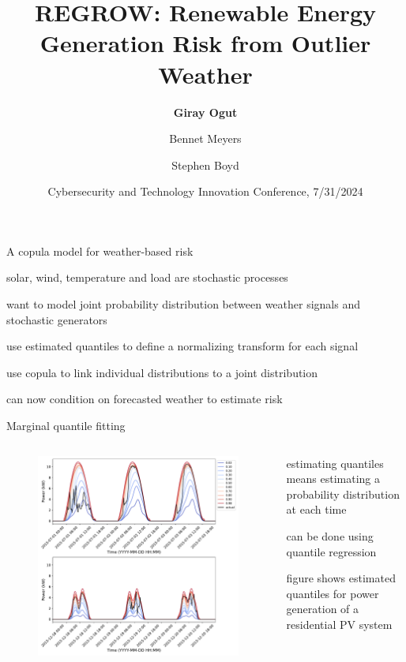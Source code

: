 \documentclass[aspectratio=169,11pt]{beamer}
\title{
REGROW: Renewable Energy Generation Risk from Outlier Weather
}
\author{
\textbf{Giray Ogut}\inst{1} \and Bennet Meyers\inst{2} \and Stephen Boyd\inst{1}
}
\institute{
\inst{1} Stanford University \\
\inst{2} SLAC National Accelerator Laboratory
}
\date{\small Cybersecurity and Technology Innovation Conference, 7/31/2024}
\begin{document}
\begin{frame}
\titlepage
\end{frame}

\begin{frame}{A copula model for weather-based risk}
\BIT
\item solar, wind, temperature and load are stochastic processes
\item want to model joint probability distribution between weather signals and stochastic generators
\item use estimated quantiles to define a normalizing transform for each signal
\item use copula to link individual distributions to a joint distribution
\item can now condition on forecasted weather to estimate risk
\EIT
\end{frame}

\begin{frame}{Marginal quantile fitting}
\begin{columns}
	\begin{column}{0.55\textwidth}
		\begin{figure}
			\centering
			\includegraphics[width=\columnwidth]{./figures/quantiles_mapped_back.pdf}
		\end{figure}
	\end{column}
	\begin{column}{0.45\textwidth}
		\BIT
		\item estimating quantiles means estimating a probability distribution at each time
		\item can be done using quantile regression
		\item figure shows estimated quantiles for power generation of a residential PV system
		\EIT
	\end{column}
\end{columns}
\end{frame}
\end{document}
